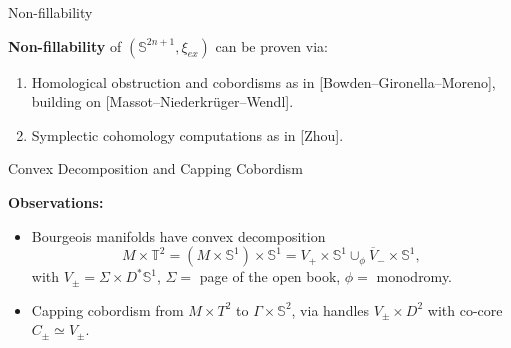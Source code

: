 \documentclass{beamer}
\begin{document}
\begin{frame}{Non-fillability}

\textbf{Non-fillability} of $(\mathbb S^{2n+1},\xi_{ex})$ can be proven via:

\begin{enumerate}
    \item Homological obstruction and cobordisms as in [Bowden--Gironella--Moreno], building on [Massot--Niederkr\"uger--Wendl].
    \item Symplectic cohomology computations as in [Zhou].
\end{enumerate}

\end{frame}

\begin{frame}{Convex Decomposition and Capping Cobordism}

\textbf{Observations:} 
\begin{itemize}
    \item Bourgeois manifolds have convex decomposition $$M\times \mathbb T^2=(M\times \mathbb S^1)\times \mathbb S^1= V_+\times \mathbb S^1 \cup_\phi \overline{V}_-\times \mathbb S^1,$$ with $V_\pm=\Sigma \times D^*\mathbb S^1$, $\Sigma=$ page of the open book, $\phi=$ monodromy.
    
    \pause
    
    \item Capping cobordism from $M\times T^2$ to $\Gamma\times \mathbb S^2$, via handles $V_\pm \times D^2$ with co-core $C_\pm \simeq V_\pm$.
\end{itemize}
\end{frame}

\end{document}
